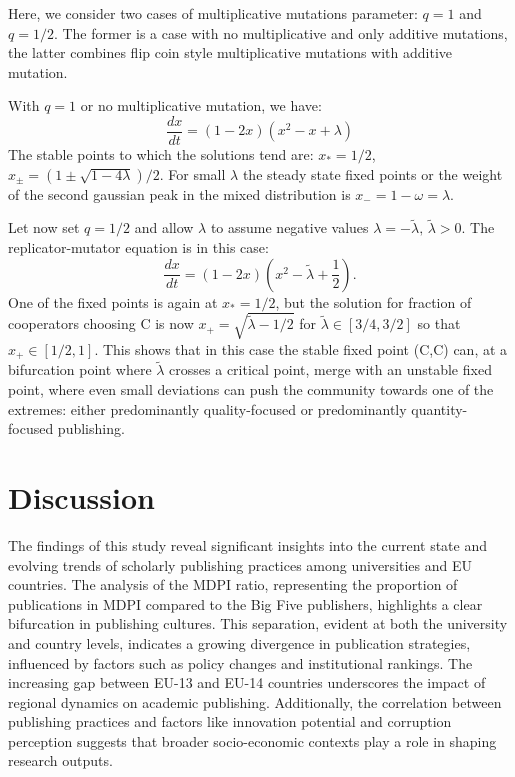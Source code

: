 \documentclass[amsfonts, amssymb, prl, superscriptaddress, notitlepage, twocolumn, nofootinbib]{revtex4-2}
\begin{document}
Here, we consider two cases of multiplicative mutations parameter: $q=1$ and $q=1/2$. The former is a case with no multiplicative and only additive mutations, the latter combines flip coin style multiplicative mutations with additive mutation. 

With $q=1$ or no multiplicative mutation, we have:
\begin{equation}
    \frac{dx}{dt} = (1-2x)(x^2-x+\lambda)
\end{equation}
The stable points to which the solutions tend are: $x_*=1/2$, $x_{\pm}=(1\pm\sqrt{1-4\lambda})/2$. For small $\lambda$ the steady state fixed points or the weight of the second gaussian peak in the mixed distribution is $x_- =1-\omega=\lambda$.

Let now set $q=1/2$ and allow $\lambda$ to assume negative values $\lambda = -\tilde{\lambda},\, \tilde{\lambda}>0$. The replicator-mutator equation is in this case:
\begin{equation}
    \frac{dx}{dt} = (1-2x)\left(x^2-\tilde{\lambda} +\frac{1}{2}\right).
\end{equation}
One of the fixed points is again at $x_*=1/2$, but the solution for fraction of cooperators choosing C is now $x_+ = \sqrt{\tilde{\lambda}-1/2}$ for $\tilde\lambda\in [3/4,3/2]$ so that $x_+ \in [1/2,1]$. This shows that in this case the stable fixed point (C,C) can, at a bifurcation point where $\tilde\lambda$ crosses a critical point, merge with an unstable fixed point, where even small deviations can push the community towards one of the extremes: either predominantly quality-focused or predominantly quantity-focused publishing. 


\section{Discussion}
The findings of this study reveal significant insights into the current state and evolving trends of scholarly publishing practices among universities and EU countries. The analysis of the MDPI ratio, representing the proportion of publications in MDPI compared to the Big Five publishers, highlights a clear bifurcation in publishing cultures. This separation, evident at both the university and country levels, indicates a growing divergence in publication strategies, influenced by factors such as policy changes and institutional rankings. The increasing gap between EU-13 and EU-14 countries underscores the impact of regional dynamics on academic publishing. Additionally, the correlation between publishing practices and factors like innovation potential and corruption perception suggests that broader socio-economic contexts play a role in shaping research outputs. 
\end{document}
